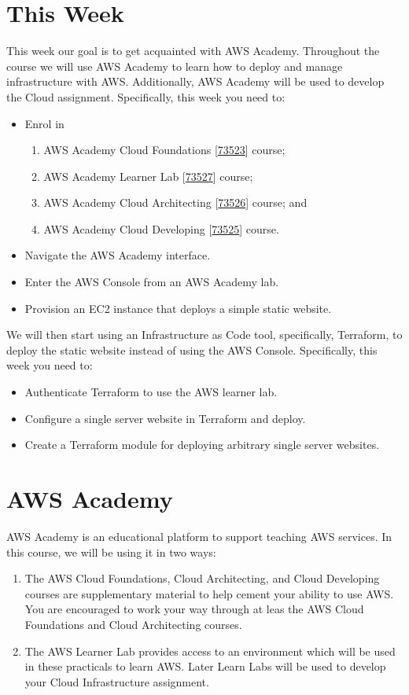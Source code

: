 \documentclass{csse4400}
\begin{document}
\section{This Week}
This week our goal is to get acquainted with AWS Academy.
Throughout the course we will use AWS Academy to learn how to deploy and manage infrastructure with AWS.
Additionally, AWS Academy will be used to develop the Cloud assignment.
Specifically, this week you need to:
\begin{itemize}
    \item Enrol in
    \begin{enumerate}
        \item AWS Academy Cloud Foundations [\href{https://awsacademy.instructure.com/courses/73523}{73523}] course;
        \item AWS Academy Learner Lab [\href{https://awsacademy.instructure.com/courses/73527}{73527}] course;
        \item AWS Academy Cloud Architecting [\href{https://awsacademy.instructure.com/courses/73526}{73526}] course; and
        \item AWS Academy Cloud Developing [\href{https://awsacademy.instructure.com/courses/73525}{73525}] course.
    \end{enumerate}
    \item Navigate the AWS Academy interface.
    \item Enter the AWS Console from an AWS Academy lab.
    \item Provision an EC2 instance that deploys a simple static website.
\end{itemize}

We will then start using an Infrastructure as Code tool,
specifically, Terraform,
to deploy the static website instead of using the AWS Console.
Specifically, this week you need to:
\begin{itemize}
    \item Authenticate Terraform to use the AWS learner lab.
    \item Configure a single server website in Terraform and deploy.
    \item Create a Terraform module for deploying arbitrary single server websites.
\end{itemize}

\section{AWS Academy}
AWS Academy is an educational platform to support teaching AWS services.
In this course, we will be using it in two ways:
\begin{enumerate}
    \item The AWS Cloud Foundations, Cloud Architecting, and Cloud Developing courses are supplementary material to help cement your ability to use AWS.
        You are encouraged to work your way through at leas the AWS Cloud Foundations and Cloud Architecting courses.
    \item The AWS Learner Lab provides access to an environment which will be used in these practicals to learn AWS. 
        Later Learn Labs will be used to develop your Cloud Infrastructure assignment.
\end{enumerate}
\end{document}
